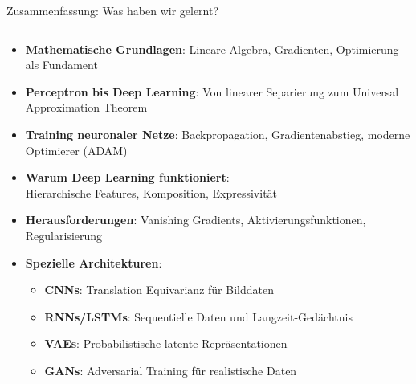 \documentclass[aspectratio=1610, xcolor=dvipsnames, 9pt]{beamer}
\begin{document}
\begin{frame}{Zusammenfassung: Was haben wir gelernt?}
  \begin{columns}
    \begin{column}{1\textwidth}
      \begin{itemize}
        \item \textbf{Mathematische Grundlagen}: Lineare Algebra, Gradienten, Optimierung als Fundament
        \item \textbf{Perceptron bis Deep Learning}: Von linearer Separierung zum Universal Approximation Theorem
        \item \textbf{Training neuronaler Netze}: Backpropagation, Gradientenabstieg, moderne Optimierer (ADAM)
        \item \textbf{Warum Deep Learning funktioniert}: \\
          Hierarchische Features, Komposition, Expressivität
        \item \textbf{Herausforderungen}: Vanishing Gradients, Aktivierungsfunktionen, Regularisierung
        \item \textbf{Spezielle Architekturen}:
        \begin{itemize}
          \item \textbf{CNNs}: Translation Equivarianz für Bilddaten
          \item \textbf{RNNs/LSTMs}: Sequentielle Daten und Langzeit-Gedächtnis
          \item \textbf{VAEs}: Probabilistische latente Repräsentationen
          \item \textbf{GANs}: Adversarial Training für realistische Daten
        \end{itemize}
      \end{itemize}
    \end{column}
  \end{columns}
\end{frame}
\end{document}
